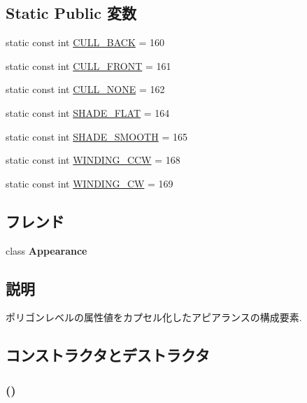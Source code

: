 \subsection*{Static Public 変数}
\begin{CompactItemize}
\item 
static const int \hyperlink{classm3g_1_1PolygonMode_34ae9162b765ddbc1d2476edf3195361}{CULL\_\-BACK} = 160
\item 
static const int \hyperlink{classm3g_1_1PolygonMode_efa180528b010979c6f7732c3c3114ae}{CULL\_\-FRONT} = 161
\item 
static const int \hyperlink{classm3g_1_1PolygonMode_48717ad405f481d0f2ab8e948bf86822}{CULL\_\-NONE} = 162
\item 
static const int \hyperlink{classm3g_1_1PolygonMode_5da32249eba3f6eb4366f016c424099e}{SHADE\_\-FLAT} = 164
\item 
static const int \hyperlink{classm3g_1_1PolygonMode_2da5e6696c8e910d9fca74b583a081df}{SHADE\_\-SMOOTH} = 165
\item 
static const int \hyperlink{classm3g_1_1PolygonMode_98d881cf813edf483860268535014210}{WINDING\_\-CCW} = 168
\item 
static const int \hyperlink{classm3g_1_1PolygonMode_86975b3dec0d6cc20f54fd82eb13ef9e}{WINDING\_\-CW} = 169
\end{CompactItemize}
\subsection*{フレンド}
\begin{CompactItemize}
\item 
\hypertarget{classm3g_1_1PolygonMode_afa5201a494f65c37039281d9b63a2a9}{
class \textbf{Appearance}}
\label{classm3g_1_1PolygonMode_afa5201a494f65c37039281d9b63a2a9}

\end{CompactItemize}


\subsection{説明}
ポリゴンレベルの属性値をカプセル化したアピアランスの構成要素. 

\subsection{コンストラクタとデストラクタ}
\hypertarget{classm3g_1_1PolygonMode_b089ee808cbc4799bb2e92dd4ca554c3}{
\subsubsection[{PolygonMode}]{ ()}}
\label{classm3g_1_1PolygonMode_b089ee808cbc4799bb2e92dd4ca554c3}



